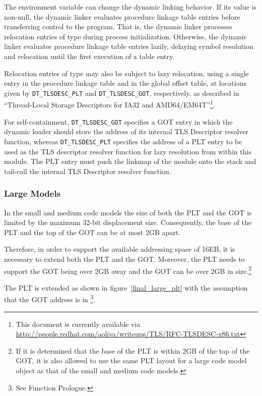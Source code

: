 The  environment variable can change the dynamic
linking behavior.  If its value is non-null, the dynamic linker
evaluates procedure linkage table entries before transferring control
to the program.  That is, the dynamic linker processes relocation
entries of type 
during process initialization.  Otherwise, the dynamic linker
evaluates procedure linkage table entries lazily, delaying symbol
resolution and relocation until the first execution of a table entry.

Relocation entries of type  may also be
subject to lazy relocation, using a single entry in the procedure
linkage table and in the global offset table, at locations given by
\texttt{DT_TLSDESC_PLT} and \texttt{DT_TLSDESC_GOT}, respectively, as
described in ``Thread-Local Storage Descriptors for IA32 and
AMD64/EM64T''\footnote{This document is currently available via
  \url{http://people.redhat.com/aoliva/writeups/TLS/RFC-TLSDESC-x86.txt}}.

For self-containment, \texttt{DT_TLSDESC_GOT} specifies a GOT entry in
which the dynamic loader should store the address of its internal TLS
Descriptor resolver function, whereas \texttt{DT_TLSDESC_PLT}
specifies the address of a PLT entry to be used as the TLS descriptor
resolver function for lazy resolution from within this module.  The
PLT entry must push the linkmap of the module onto the stack and
tail-call the internal TLS Descriptor resolver function.

\subsubsection{Large Models}

In the small and medium code models the size of both the PLT and the GOT
is limited by the maximum 32-bit displacement size.
Consequently, the base of the PLT and the
top of the GOT can be at most 2GB apart.

Therefore, in order to support the available addressing space of 16EB,
it is necessary to extend both the PLT and the GOT. Moreover, the PLT
needs to support the GOT being over 2GB away and the GOT can be over
2GB in size.\footnote{If it is determined that the base of the PLT is
within 2GB of the top of the GOT, it is also allowed to use the same
PLT layout for a large code model object as that of the small and
medium code models.}

The PLT is extended as shown in figure~\ref{final_large_plt}
with the assumption that the GOT address is
in \footnote{See Function Prologue.}.

